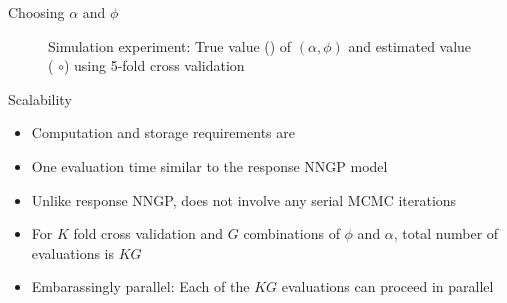 \begin{frame}{Choosing $\alpha$ and $\phi$}
\begin{figure}[!ht]
\begin{center}
\end{center}
\caption{Simulation experiment: True value (\red{$+$}) of $(\alpha,\phi)$ and estimated value ({\color{green} $\circ$}) using 5-fold cross validation }
\end{figure}
\end{frame}

\begin{frame}{Scalability}
\begin{itemize}
\item Computation and storage requirements are 
\item One evaluation time similar to the response NNGP model
\item Unlike response NNGP, does not involve any serial MCMC iterations
\item For $K$ fold cross validation and $G$ combinations of $\phi$ and $\alpha$, total number of evaluations is $KG$
\item \alert{Embarassingly parallel:} Each of the $KG$ evaluations can proceed in parallel
\end{itemize}
\end{frame}

